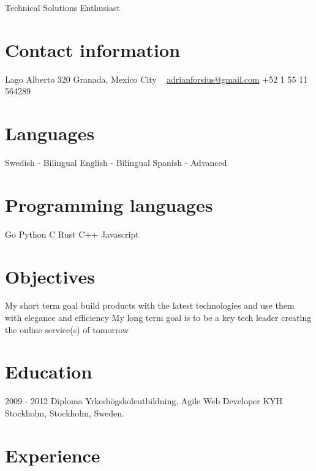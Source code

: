 \documentclass[]{friggeri-cv}
\begin{document}
       {Technical Solutions Enthusiast}

\begin{aside}
  \section{Contact information}
    Lago Alberto 320
    Granada, Mexico City
    ~
    \href{mailto:adrianforsius@gmail.com}{adrianforsius@gmail.com}
    +52 1 55 11 564289
  \section{Languages}
    Swedish - Bilingual
    English - Bilingual
    Spanish - Advanced
  \section{Programming languages}
    Go
    Python
    C
    Rust
    C++
    Javascript
\end{aside}

\section{Objectives}
    My short term goal build products with the latest technologies and use them with elegance and efficiency
    My long term goal is to be a key tech leader creating the online service(s) of tomorrow

\section{Education}

\begin{entrylist}
  \entry
    {2009 - 2012}
    {Diploma Yrkeshögskoleutbildning, Agile Web Developer}
    {}
    {KYH Stockholm, Stockholm, Sweden.}
\end{entrylist}

\section{Experience}
\end{document}
